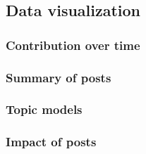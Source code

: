 \subsection{Data visualization}
\subsubsection{Contribution over time}
\subsubsection{Summary of posts}
\subsubsection{Topic models}
\subsubsection{Impact of posts}



